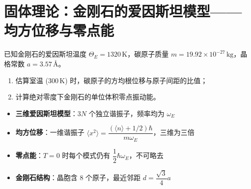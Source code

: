 \section{固体理论：金刚石的爱因斯坦模型——均方位移与零点能}
\label{sec:diamond-einstein}

\begin{modelbox}[题目：金刚石的爱因斯坦模型数值计算]
已知金刚石的爱因斯坦温度 $\Theta_E=1320\,\mathrm{K}$，碳原子质量 $m=19.92\times10^{-27}\,\mathrm{kg}$，晶格常数 $a=3.57\,\text{\AA}$。
\begin{enumerate}
    \item 估算室温 ($300\,\mathrm{K}$) 时，碳原子的方均根位移与原子间距的比值；
    \item 计算绝对零度下金刚石的单位体积零点振动能。
\end{enumerate}
\end{modelbox}

\begin{tipbox}[考点快速分析]
\begin{itemize}
    \item \textbf{三维爱因斯坦模型}：$3N$ 个独立谐振子，频率均为 $\omega_E$
    \item \textbf{均方位移}：一维谐振子 $\langle x^2\rangle=\dfrac{(\langle n\rangle+1/2)\hbar}{m\omega_E}$，三维为三倍
    \item \textbf{零点能}：$T=0$ 时每个模式仍有 $\dfrac12\hbar\omega_E$，不可略去
    \item \textbf{金刚石结构}：晶胞含 8 个原子，最近邻距 $d=\dfrac{\sqrt3}{4}a$
\end{itemize}
\end{tipbox}


